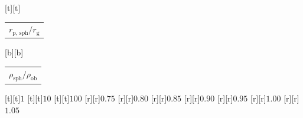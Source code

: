 %    
%
%
\begin{psfrags}%
\psfragscanon%
%
[t][t]{\color[rgb]{0,0,0}\setlength{\tabcolsep}{0pt}\begin{tabular}{c}{\Large$r_\mathrm{p,\,sph}/r_\mathrm{g}$}\end{tabular}}%
[b][b]{\color[rgb]{0,0,0}\setlength{\tabcolsep}{0pt}\begin{tabular}{c}{\Large$\rho_\mathrm{sph}/\rho_\mathrm{ob}$}\end{tabular}}%
%
[t][t]{$1$}%
[t][t]{$10$}%
[t][t]{$100$}%
%
[r][r]{$0.75$}%
[r][r]{$0.80$}%
[r][r]{$0.85$}%
[r][r]{$0.90$}%
[r][r]{$0.95$}%
[r][r]{$1.00$}%
[r][r]{$1.05$}%
%
%
\end{psfrags}%
%
